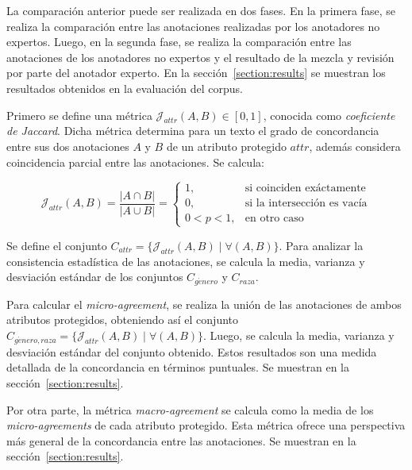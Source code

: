 La comparaci\'on anterior puede ser realizada en dos fases. En la primera fase, se realiza la comparaci\'on entre las anotaciones 
realizadas por los anotadores no expertos. Luego, en la segunda fase, se realiza la comparaci\'on entre las anotaciones de los 
anotadores no expertos y el resultado de la mezcla y revisi\'on por parte del anotador experto. En la secci\'on~\ref{section:results} 
se muestran los resultados obtenidos en la evaluaci\'on del corpus.

Primero se define una m\'etrica $\mathcal{J}_{attr}(A, B) \in [0,1]$, conocida como \emph{coeficiente de Jaccard}. Dicha m\'etrica 
determina para un texto el grado de concordancia entre sus dos anotaciones $A$ y $B$ de un atributo protegido $attr$, adem\'as 
considera coincidencia parcial entre las anotaciones. Se calcula:

\begin{equation*}
    \mathcal{J}_{attr}(A, B) = \frac{|A \cap B|}{|A \cup B|} = \begin{cases}
        1, & \text{si coinciden ex\'actamente} \\
        0, & \text{si la intersecci\'on es vac\'ia} \\
        0 < p < 1, & \text{en otro caso}
    \end{cases}
\end{equation*}

Se define el conjunto $C_{attr} = \{\mathcal{J}_{attr}(A, B) \mid \forall (A, B)\}$. Para analizar la consistencia estad\'istica 
de las anotaciones, se calcula la media, varianza y desviaci\'on est\'andar de los conjuntos $C_{g\acute{e}nero}$ y $C_{raza}$.

Para calcular el \emph{micro-agreement}, se realiza la uni\'on de las anotaciones de ambos atributos protegidos, obteniendo as\'i
el conjunto $C_{g\acute{e}nero, raza} = \{\mathcal{J}_{attr}(A, B) \mid \forall (A, B)\}$. Luego, se calcula la media, varianza y
desviaci\'on est\'andar del conjunto obtenido. Estos resultados son una medida detallada de la concordancia en t\'erminos puntuales.
Se muestran en la secci\'on~\ref{section:results}.

Por otra parte, la m\'etrica \emph{macro-agreement} se calcula como la media de los \emph{micro-agreements} de cada atributo protegido. 
Esta m\'etrica ofrece una perspectiva m\'as general de la concordancia entre las anotaciones. Se muestran en la 
secci\'on~\ref{section:results}.

